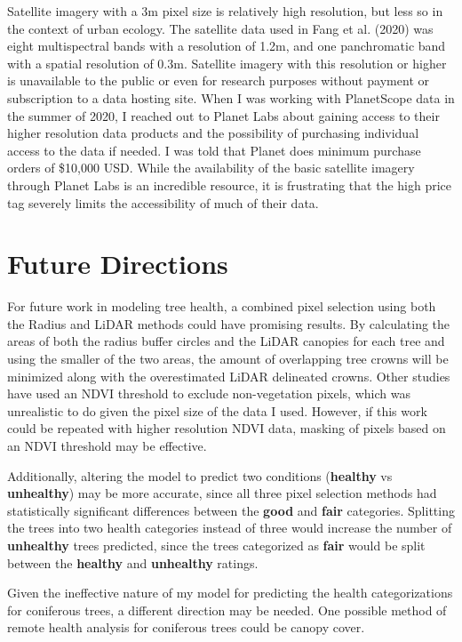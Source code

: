 \documentclass[12pt,twoside]{reedthesis}
\begin{document}
Satellite imagery with a 3m pixel size is relatively high resolution,
but less so in the context of urban ecology. The satellite data used in
Fang et al. (2020) was eight multispectral bands with a resolution of 1.2m, and
one panchromatic band with a spatial resolution of 0.3m. Satellite
imagery with this resolution or higher is unavailable to the public or
even for research purposes without payment or subscription to a data
hosting site. When I was working with PlanetScope data in the summer of
2020, I reached out to Planet Labs about gaining access to their higher
resolution data products and the possibility of purchasing individual
access to the data if needed. I was told that Planet does minimum
purchase orders of \$10,000 USD. While the availability of the basic
satellite imagery through Planet Labs is an incredible resource, it is
frustrating that the high price tag severely limits the accessibility of
much of their data.

\hypertarget{future-directions}{%
\section{Future Directions}\label{future-directions}}

For future work in modeling tree health, a combined pixel selection
using both the Radius and LiDAR methods could have promising results. By
calculating the areas of both the radius buffer circles and the LiDAR
canopies for each tree and using the smaller of the two areas, the
amount of overlapping tree crowns will be minimized along with the
overestimated LiDAR delineated crowns. Other studies have used an NDVI
threshold to exclude non-vegetation pixels, which was unrealistic to do
given the pixel size of the data I used. However, if this work could be
repeated with higher resolution NDVI data, masking of pixels based on an
NDVI threshold may be effective.

Additionally, altering the model to predict two conditions (\textbf{healthy}
vs \textbf{unhealthy}) may be more accurate, since all three pixel selection
methods had statistically significant differences between the \textbf{good}
and \textbf{fair} categories. Splitting the trees into two health categories
instead of three would increase the number of \textbf{unhealthy} trees
predicted, since the trees categorized as \textbf{fair} would be split
between the \textbf{healthy} and \textbf{unhealthy} ratings.

Given the ineffective nature of my model for predicting the health
categorizations for coniferous trees, a different direction may be
needed. One possible method of remote health analysis for coniferous
trees could be canopy cover.
\end{document}
